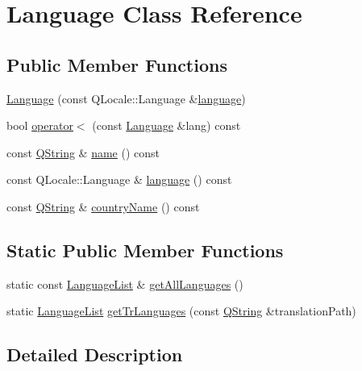 \hypertarget{class_language}{\section{Language Class Reference}
\label{class_language}
}
\subsection*{Public Member Functions}
\begin{DoxyCompactItemize}
\item 
\hyperlink{class_language_a2f8aca3c60fa99ab2db722e08811fd2a}{Language} (const Q\-Locale\-::\-Language \&\hyperlink{class_language_a260819f1bbf01d18ad8aebe6f8a256d1}{language})
\item 
bool \hyperlink{class_language_a05ece75cb6309232e8c42498fe6d6f43}{operator$<$} (const \hyperlink{class_language}{Language} \&lang) const 
\item 
const \hyperlink{group___u_a_v_objects_plugin_gab9d252f49c333c94a72f97ce3105a32d}{Q\-String} \& \hyperlink{class_language_ab9caab9ea7ab2dd62d99e0472e1fb26e}{name} () const 
\item 
const Q\-Locale\-::\-Language \& \hyperlink{class_language_a260819f1bbf01d18ad8aebe6f8a256d1}{language} () const 
\item 
const \hyperlink{group___u_a_v_objects_plugin_gab9d252f49c333c94a72f97ce3105a32d}{Q\-String} \& \hyperlink{class_language_a0ebbd3bf2614e1599ec3f08a7dbb1413}{country\-Name} () const 
\end{DoxyCompactItemize}
\subsection*{Static Public Member Functions}
\begin{DoxyCompactItemize}
\item 
static const \hyperlink{qxtlanguagecombobox_8cpp_a3ed70ebce87136a0d0a8ed4ab014a352}{Language\-List} \& \hyperlink{class_language_a7f6520fb998f36d667ecf65bfdb41808}{get\-All\-Languages} ()
\item 
static \hyperlink{qxtlanguagecombobox_8cpp_a3ed70ebce87136a0d0a8ed4ab014a352}{Language\-List} \hyperlink{class_language_a8b6111c75f5ec9317cf8ff2257abcb9c}{get\-Tr\-Languages} (const \hyperlink{group___u_a_v_objects_plugin_gab9d252f49c333c94a72f97ce3105a32d}{Q\-String} \&translation\-Path)
\end{DoxyCompactItemize}


\subsection{Detailed Description}


